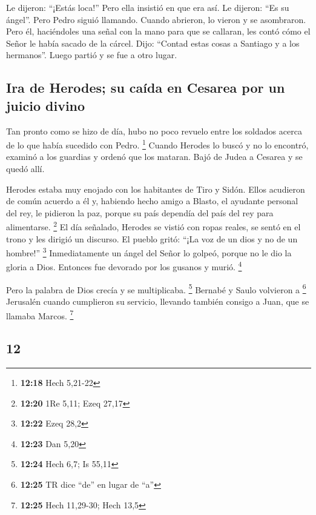 \begin{paracol}{2}
 Le dijeron: ``¡Estás loca!'' Pero ella insistió en que
era así. Le dijeron: ``Es su ángel''.  Pero Pedro siguió
llamando. Cuando abrieron, lo vieron y se asombraron. 
Pero él, haciéndoles una señal con la mano para que se callaran, les
contó cómo el Señor le había sacado de la cárcel. Dijo: ``Contad estas
cosas a Santiago y a los hermanos''. Luego partió y se fue a otro lugar.

\hypertarget{ira-de-herodes-su-cauxedda-en-cesarea-por-un-juicio-divino}{%
\subsection{Ira de Herodes; su caída en Cesarea por un juicio
divino}\label{ira-de-herodes-su-cauxedda-en-cesarea-por-un-juicio-divino}}

 Tan pronto como se hizo de día, hubo no poco revuelo
entre los soldados acerca de lo que había sucedido con Pedro.
\footnote{\textbf{12:18} Hech 5,21-22}  Cuando Herodes lo
buscó y no lo encontró, examinó a los guardias y ordenó que los mataran.
Bajó de Judea a Cesarea y se quedó allí.

 Herodes estaba muy enojado con los habitantes de Tiro y
Sidón. Ellos acudieron de común acuerdo a él y, habiendo hecho amigo a
Blasto, el ayudante personal del rey, le pidieron la paz, porque su país
dependía del país del rey para alimentarse. \footnote{\textbf{12:20} 1Re
  5,11; Ezeq 27,17}  El día señalado, Herodes se vistió
con ropas reales, se sentó en el trono y les dirigió un discurso.
 El pueblo gritó: ``¡La voz de un dios y no de un
hombre!'' \footnote{\textbf{12:22} Ezeq 28,2} 
Inmediatamente un ángel del Señor lo golpeó, porque no le dio la gloria
a Dios. Entonces fue devorado por los gusanos y murió. \footnote{\textbf{12:23}
  Dan 5,20}

 Pero la palabra de Dios crecía y se multiplicaba.
\footnote{\textbf{12:24} Hech 6,7; Is 55,11}  Bernabé y
Saulo volvieron a \footnote{\textbf{12:25} TR dice ``de'' en lugar de
  ``a''} Jerusalén cuando cumplieron su servicio, llevando también
consigo a Juan, que se llamaba Marcos. \footnote{\textbf{12:25} Hech
  11,29-30; Hech 13,5}

\switchcolumn
\begin{otherlanguage}{english}

\hypertarget{section-23}{%
\section{12}\label{section-23}}


\end{otherlanguage}
\end{paracol}
